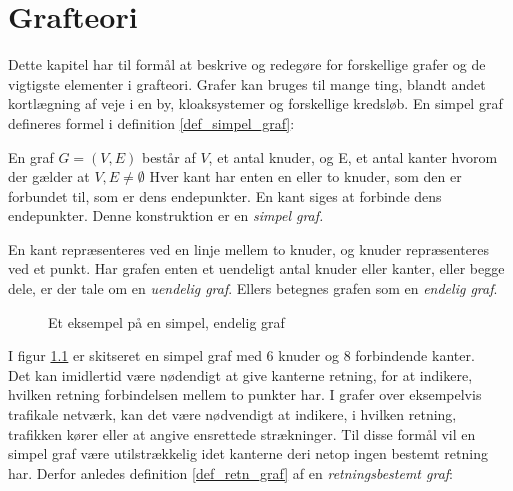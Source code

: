 \chapter{Grafteori}
\usetikzlibrary{arrows, automata}

Dette kapitel har til formål at beskrive og redegøre for forskellige grafer og de vigtigste elementer i grafteori. 
Grafer kan bruges til mange ting, blandt andet kortlægning af veje i en by, kloaksystemer og forskellige kredsløb.
En simpel graf defineres formel i definition \ref{def_simpel_graf}:


\begin{defn}
En graf $G = (V, E)$ består af $V$, et antal knuder, og E, et antal kanter hvorom der gælder at $V, E \neq \emptyset$
Hver kant har enten en eller to knuder, som den er forbundet til, som er dens endepunkter.
En kant siges at forbinde dens endepunkter. Denne konstruktion er en \it{simpel graf}.
\label{def_simpel_graf}
\end{defn}


\noindent En kant repræsenteres ved en linje mellem to knuder, og knuder repræsenteres ved et punkt. Har grafen enten et uendeligt antal knuder eller kanter, eller begge dele, er der tale om en \textit{uendelig graf}. Ellers betegnes grafen som en \textit{endelig graf}.


\begin{figure}[h]
\centering
{}
\caption{Et eksempel på en simpel, endelig graf} \label{simpel_graf}
\end{figure}


\noindent I figur \ref{simpel_graf} er skitseret en simpel graf med $6$ knuder og $8$ forbindende kanter. \\
Det kan imidlertid være nødendigt at give kanterne retning, for at indikere, hvilken retning forbindelsen mellem to punkter har. I grafer over eksempelvis trafikale netværk, kan det være nødvendigt at indikere, i hvilken retning, trafikken kører eller at angive ensrettede strækninger. Til disse formål vil en simpel graf være utilstrækkelig idet kanterne deri netop ingen bestemt retning har. Derfor anledes definition \ref{def_retn_graf} 
af en \textit{retningsbestemt graf}:

